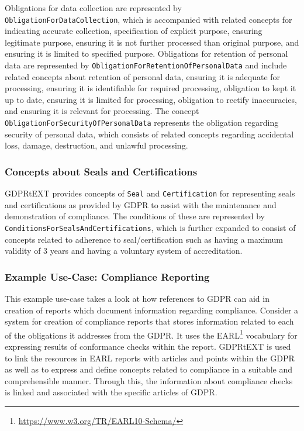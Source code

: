Obligations for data collection are represented by \texttt{ObligationForDataCollection}, which is accompanied with related concepts for indicating accurate collection, specification of explicit purpose, ensuring legitimate purpose, ensuring it is not further processed than original purpose, and ensuring it is limited to specified purpose.
Obligations for retention of personal data are represented by \texttt{ObligationForRetentionOfPersonalData} and include related concepts about    retention of personal data, ensuring it is adequate for processing, ensuring it is identifiable for required processing, obligation to kept it up to date, ensuring it is limited for processing, obligation to rectify inaccuracies, and ensuring it is relevant for processing. 
The concept \texttt{ObligationForSecurityOfPersonalData} represents the obligation regarding security of personal data, which consists of related concepts regarding accidental loss, damage, destruction, and unlawful processing.

\subsubsection{Concepts about Seals and Certifications}
GDPRtEXT provides concepts of \texttt{Seal} and \texttt{Certification} for representing seals and certifications as provided by GDPR to assist with the maintenance and demonstration of compliance.
The conditions of these are represented by \texttt{ConditionsForSealsAndCertifications}, which is further expanded to consist of concepts related to adherence to seal/certification such as having a maximum validity of 3 years and having a voluntary system of accreditation. 

\subsubsection{Example Use-Case: Compliance Reporting}
This example use-case takes a look at how references to GDPR can aid in creation of reports which document information regarding compliance. Consider a system for creation of compliance reports that stores information related to each of the obligations it addresses from the GDPR. It uses the EARL\footnote{\url{https://www.w3.org/TR/EARL10-Schema/}} vocabulary for expressing results of conformance checks within the report. GDPRtEXT is used to link the resources in EARL reports with articles and points within the GDPR as well as to express and define concepts related to compliance in a suitable and comprehensible manner. Through this, the information about compliance checks is linked and associated with the specific articles of GDPR.

